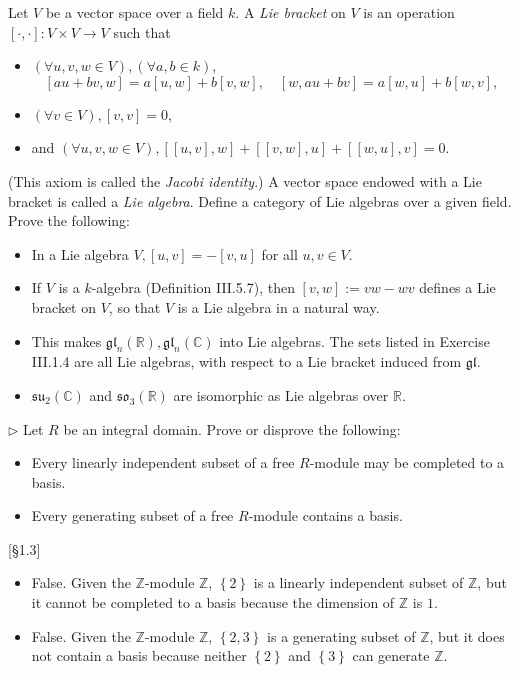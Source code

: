 \hypertarget{Exercise VI.1.4}{}
\begin{problem}[1.4]
Let $V$ be a vector space over a field $k$. A \emph{Lie bracket} on $V$ is an operation
$[\cdot, \cdot]: V \times V \rightarrow V$ such that
\begin{itemize}
	\item $(\forall u, v, w \in V),(\forall a, b \in k)$,
$$
[a u+b v, w]=a[u, w]+b[v, w], \quad[w, a u+b v]=a[w, u]+b[w, v],
$$
\item $(\forall v \in V),[v, v]=0$,
\item and $(\forall u, v, w \in V),[[u, v], w]+[[v, w], u]+[[w, u], v]=0$.
\end{itemize}
(This axiom is called the \emph{Jacobi identity}.) A vector space endowed with a Lie bracket is called a \emph{Lie algebra}. Define a category of Lie algebras over a given field. Prove the following:
\begin{itemize}
	\item In a Lie algebra $V,[u, v]=-[v, u]$ for all $u, v \in V$.
	\item If $V$ is a $k$-algebra (Definition III.5.7), then $[v, w]:=v w-w v$ defines a Lie bracket on $V$, so that $V$ is a Lie algebra in a natural way.
	\item This makes $\mathfrak{g l}_n(\mathbb{R}), \mathfrak{g l}_n(\mathbb{C})$ into Lie algebras. The sets listed in Exercise III.1.4 are all Lie algebras, with respect to a Lie bracket induced from $\mathfrak{g l}$.
	\item $\mathfrak{s u}{ }_2(\mathbb{C})$ and $\mathfrak{s o}_3(\mathbb{R})$ are isomorphic as Lie algebras over $\mathbb{R}$.
\end{itemize}
\end{problem}
\begin{solution}

\end{solution}

\begin{problem}[1.5]
$\triangleright$ Let $R$ be an integral domain. Prove or disprove the following:
\begin{itemize}
	\item Every linearly independent subset of a free $R$-module may be completed to a basis.
	\item Every generating subset of a free $R$-module contains a basis.
\end{itemize}
[\S 1.3]
\end{problem}
\begin{solution}
\begin{itemize}
	\item False. Given the $\mathbb{Z}$-module $\mathbb{Z}$, $\left\{2\right\}$ is a linearly independent subset of $\mathbb{Z}$, but it cannot be completed to a basis because the dimension of $\mathbb{Z}$ is $1$.
	\item False. Given the $\mathbb{Z}$-module $\mathbb{Z}$, $\left\{2, 3\right\}$ is a generating subset of $\mathbb{Z}$, but it does not contain a basis because neither $\left\{2\right\}$ and $\left\{3\right\}$ can generate $\mathbb{Z}$.
\end{itemize}
\end{solution}

